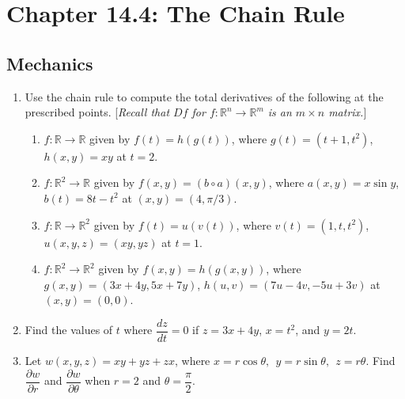 
\fancyhead[R]{\dayten}

\section*{\centering Chapter 14.4: The Chain Rule}
\subsection*{Mechanics}
\begin{enumerate}
	\item Use the chain rule to compute the total derivatives of the following at the prescribed points. [\textit{Recall that $Df$ for $f:\mathbb{R}^n\to\mathbb{R}^m$ is an $m\times n$ matrix.}]
    \begin{enumerate}
		\item $f:\mathbb{R}\to\mathbb{R}$ given by $f(t)=h(g(t))$, where $g(t)= (t+1,t^2)$, $h(x,y)=xy$ at $t=2$.
		\item $f:\mathbb{R}^2\to\mathbb{R}$ given by $f(x,y)=(b\circ a)(x,y)$, where $a(x,y)= x\sin y$, $b(t)=8t-t^2$ at $(x,y)=(4,\pi/3)$. 
        \item $f:\mathbb{R}\to\mathbb{R}^2$ given by $f(t)=u(v(t))$, where $v(t)= (1,t,t^2)$, $u(x,y,z) = (xy,yz)$ at $t=1$. 
        \item $f:\mathbb{R}^2\to\mathbb{R}^2$ given by $f(x,y)=h(g(x,y))$, where $g(x,y)=(3x+4y,5x+7y)$, $h(u,v) = (7u-4v,-5u+3v)$ at $(x,y)=(0,0)$. 
	\end{enumerate}
	\item Find the values of $t$ where $\dfrac{dz}{dt}=0$ if $z=3x+4y$, $x=t^2$, and $y=2t$.
	
	\item Let $w(x,y,z)= xy + yz + zx$, where $x= r \cos \theta, \ \ y= r \sin \theta, \ \  z= r \theta.$ 	Find $\dfrac{\partial w}{\partial r}$ and $\dfrac{\partial w}{\partial \theta}$ when $r=2$ and $\theta = \dfrac{\pi}{2}$.

\end{enumerate}
